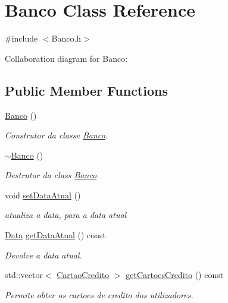 \hypertarget{class_banco}{}\section{Banco Class Reference}
\label{class_banco}


{\ttfamily \#include $<$Banco.\+h$>$}



Collaboration diagram for Banco\+:
\subsection*{Public Member Functions}
\begin{DoxyCompactItemize}
\item 
\mbox{\hyperlink{class_banco_a686e51b219dc175e432e91559298b259}{Banco}} ()
\begin{DoxyCompactList}\small\item\em Construtor da classe \mbox{\hyperlink{class_banco}{Banco}}. \end{DoxyCompactList}\item 
\mbox{\hyperlink{class_banco_af69f9b0da3521d7c1e422f21dfd5829e}{$\sim$\+Banco}} ()
\begin{DoxyCompactList}\small\item\em Destrutor da class \mbox{\hyperlink{class_banco}{Banco}}. \end{DoxyCompactList}\item 
void \mbox{\hyperlink{class_banco_a227af53b49995242c06d89bb10ffc8ea}{set\+Data\+Atual}} ()
\begin{DoxyCompactList}\small\item\em atualiza a data, para a data atual \end{DoxyCompactList}\item 
\mbox{\hyperlink{class_data}{Data}} \mbox{\hyperlink{class_banco_a0735f07636c578666068a16f6ecccd91}{get\+Data\+Atual}} () const
\begin{DoxyCompactList}\small\item\em Devolve a data atual. \end{DoxyCompactList}\item 
std\+::vector$<$ \mbox{\hyperlink{class_cartao_credito}{Cartao\+Credito}} $>$ \mbox{\hyperlink{class_banco_a859463228f6bf63d32d70afe8efd9541}{get\+Cartoes\+Credito}} () const
\begin{DoxyCompactList}\small\item\em Permite obter os cartoes de credito dos utilizadores. \end{DoxyCompactList}\item 

\end{DoxyCompactItemize}
